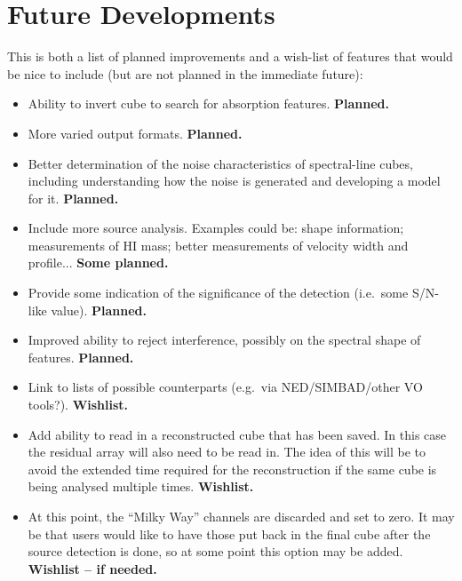 \documentclass[12pt,a4paper]{article}
\newcommand{\eg}{e.g.\ }
\newcommand{\ie}{i.e.\ }
\begin{document}
\section{Future Developments}

This is both a list of planned improvements and a wish-list of
features that would be nice to include (but are not planned in the
immediate future):

\begin{itemize}

\item Ability to invert cube to search for absorption features. {\bf
  Planned.} 

\item More varied output formats. {\bf Planned.}

\item Better determination of the noise characteristics of
  spectral-line cubes, including understanding how the noise is
  generated and developing a model for it. {\bf Planned.}
  
\item Include more source analysis. Examples could be: shape
  information; measurements of HI mass; better measurements of
  velocity width and profile... {\bf Some planned.}

\item Provide some indication of the significance of the detection
  (\ie some S/N-like value). {\bf Planned.}

\item Improved ability to reject interference, possibly on the
  spectral shape of features. {\bf Planned.}

\item Link to lists of possible counterparts (\eg via NED/SIMBAD/other
  VO tools?). {\bf Wishlist.} 

\item Add ability to read in a reconstructed cube that has been
  saved. In this case the residual array will also need to be read
  in. The idea of this will be to avoid the extended time required for
  the reconstruction if the same cube is being analysed multiple
  times. {\bf Wishlist.}
 
\item At this point, the ``Milky Way'' channels are discarded and set
  to zero. It may be that users would like to have those put back in
  the final cube after the source detection is done, so at some point
  this option may be added. {\bf Wishlist -- if needed.}

\end{itemize}
\end{document}

